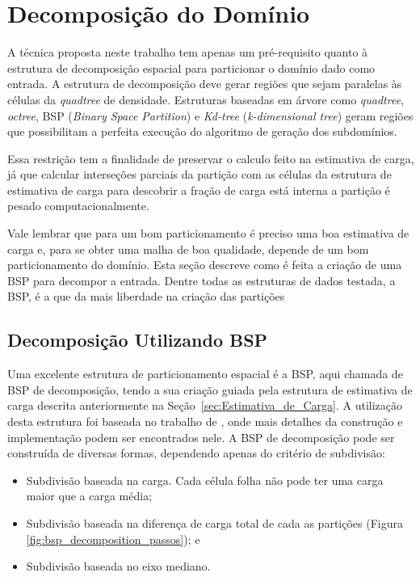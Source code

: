 \section{Decomposição do Domínio}\label{sec:Decomposicao_dominio}

A técnica proposta neste trabalho tem apenas um pré-requisito quanto à estrutura de decomposição espacial para particionar o domínio dado como entrada. A estrutura de decomposição deve gerar regiões que sejam paralelas às células da \textit{quadtree} de densidade. Estruturas baseadas em árvore como \textit{quadtree}, \textit{octree}, BSP (\textit{Binary Space Partition}) e \textit{Kd-tree} (\textit{k-dimensional tree}) geram regiões que possibilitam a perfeita execução do algoritmo de geração dos subdomínios.

Essa restrição tem a finalidade de preservar o calculo feito na estimativa de carga, já que calcular interseções parciais da partição com as células da estrutura de estimativa de carga para descobrir a fração de carga está interna a partição é pesado computacionalmente.

Vale lembrar que para um bom particionamento é preciso uma boa estimativa de carga e, para se obter uma malha de boa qualidade, depende de um bom particionamento do domínio. Esta seção descreve como é feita a criação de uma BSP para decompor a entrada. Dentre todas as estruturas de dados testada, a BSP, é a que da mais liberdade na criação das partições


\subsection{Decomposição Utilizando BSP}

Uma excelente estrutura de particionamento espacial é a BSP, aqui chamada de BSP de decomposição, tendo a sua criação guiada pela estrutura de estimativa de carga descrita anteriormente na Seção~\ref{sec:Estimativa_de_Carga}. A utilização desta estrutura foi baseada no trabalho de \cite{bib:RepMarkos13}, onde mais detalhes da construção e implementação podem ser encontrados nele. A BSP de decomposição pode ser construída de diversas formas, dependendo apenas do critério de subdivisão:


\begin{itemize}
	\item Subdivisão baseada na carga. Cada célula folha não pode ter uma carga maior que a carga média;
	\item Subdivisão baseada na diferença de carga total de cada as partições (Figura \ref{fig:bsp_decomposition_passos}); e 
	\item Subdivisão baseada no eixo mediano.
\end{itemize}


